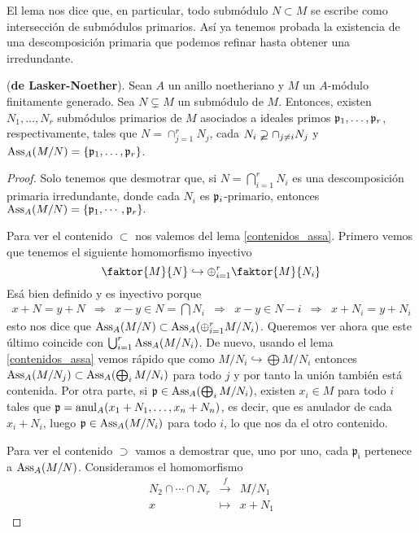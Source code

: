 \documentclass[../main.tex]{subfiles}
\begin{document}
El lema nos dice que, en particular, todo submódulo $N \subset M$ se escribe como intersección de submódulos primarios. Así ya tenemos probada la existencia de una descomposición primaria que podemos refinar hasta obtener una irredundante.

\begin{theorem} (\textbf{de Lasker-Noether}).
Sean $A$ un anillo noetheriano y $M$ un $A$-módulo finitamente generado. Sea $N\varsubsetneq M$ un submódulo de $M$. Entonces, existen $N_1,\dots,N_r$ submódulos primarios de $M$ asociados a ideales primos $\mathfrak{p}_1,\dots,\mathfrak{p}_r$, respectivamente, tales que $N=\cap_{j=1}^rN_j$, cada $N_i\varsupsetneq\cap_{j\neq i}N_j$ y $\text{Ass}_A(M/N)=\{\mathfrak{p}_1,\dots,\mathfrak{p}_r\}$.
\end{theorem}

\begin{proof}
Solo tenemos que desmotrar que, si $N=\bigcap_{i=1}^rN_i$ es una descomposición primaria irredundante, donde cada $N_i$ es $\mathfrak{p}_i$-primario, entonces $\text{Ass}_A(M/N)=\{\mathfrak{p}_1,\cdots,\mathfrak{p}_r\}.$

Para ver el contenido $\subset$ nos valemos del lema \ref{contenidos_assa}. Primero vemos que tenemos el siguiente homomorfismo inyectivo
$$\faktor{M}{N}\hookrightarrow\oplus_{i=1}^r\faktor{M}{N_i}$$
Esá bien definido y es inyectivo porque
\begin{align}
  x + N = y+N & \Rightarrow & x-y \in N = \bigcap N_i & \Rightarrow & x-y \in N-i & \Rightarrow & x+N_i = y+N_i
\end{align}
esto nos dice que $ \text{Ass}_A (M/N) \subset \text{Ass}_A(\oplus_{i=1}^rM/{N_i})$. Queremos ver ahora que este último coincide con $\bigcup_{i=1}^r\text{Ass}_A(M/{N_i})$. De nuevo, usando el lema \ref{contenidos_assa} vemos rápido que como $M/N_i \hookrightarrow \bigoplus M/N_i$ entonces $\text{Ass}_A (M/N_j) \subset \text{Ass}_A (\bigoplus_i M/N_i)$ para todo $j$ y por tanto la unión también está contenida.
Por otra parte, si $\mathfrak{p}\in  \text{Ass}_A (\bigoplus_i M/N_i)$, existen $x_i \in M$ para todo $i$ tales que $\mathfrak{p} = \operatorname{anul}_A(x_1+N_1, \dots, x_n+N_n)$, es decir, que es anulador de cada $x_i+N_i$, luego $\mathfrak{p} \in  \text{Ass}_A (M/N_i)$ para todo $i$, lo que nos da el otro contenido.

Para ver el contenido $\supset$ vamos a demostrar que, uno por uno, cada $\mathfrak{p_i}$ pertenece a $\text{Ass}_A(M/N)$. Consideramos el homomorfismo
$$\begin{array}{rcl}
    N_2\cap\cdots\cap N_r&\overset{f}{\longrightarrow}&M/N_1\\
    x&\longmapsto&x+N_1
\end{array}$$


\end{proof}
\end{document}

